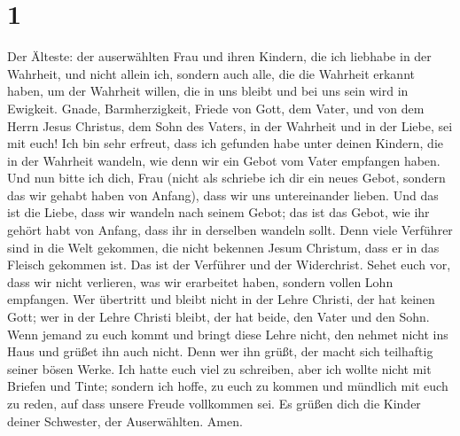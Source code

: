 \hypertarget{section}{%
\section{1}\label{section}}

 Der Älteste: der auserwählten Frau und ihren Kindern, die
ich liebhabe in der Wahrheit, und nicht allein ich, sondern auch alle,
die die Wahrheit erkannt haben,  um der Wahrheit willen, die
in uns bleibt und bei uns sein wird in Ewigkeit.  Gnade,
Barmherzigkeit, Friede von Gott, dem Vater, und von dem Herrn Jesus
Christus, dem Sohn des Vaters, in der Wahrheit und in der Liebe, sei mit
euch!  Ich bin sehr erfreut, dass ich gefunden habe unter
deinen Kindern, die in der Wahrheit wandeln, wie denn wir ein Gebot vom
Vater empfangen haben.  Und nun bitte ich dich, Frau (nicht
als schriebe ich dir ein neues Gebot, sondern das wir gehabt haben von
Anfang), dass wir uns untereinander lieben.  Und das ist die
Liebe, dass wir wandeln nach seinem Gebot; das ist das Gebot, wie ihr
gehört habt von Anfang, dass ihr in derselben wandeln sollt.
 Denn viele Verführer sind in die Welt gekommen, die nicht
bekennen Jesum Christum, dass er in das Fleisch gekommen ist. Das ist
der Verführer und der Widerchrist.  Sehet euch vor, dass wir
nicht verlieren, was wir erarbeitet haben, sondern vollen Lohn
empfangen.  Wer übertritt und bleibt nicht in der Lehre
Christi, der hat keinen Gott; wer in der Lehre Christi bleibt, der hat
beide, den Vater und den Sohn.  Wenn jemand zu euch kommt
und bringt diese Lehre nicht, den nehmet nicht ins Haus und grüßet ihn
auch nicht.  Denn wer ihn grüßt, der macht sich teilhaftig
seiner bösen Werke.  Ich hatte euch viel zu schreiben, aber
ich wollte nicht mit Briefen und Tinte; sondern ich hoffe, zu euch zu
kommen und mündlich mit euch zu reden, auf dass unsere Freude vollkommen
sei.  Es grüßen dich die Kinder deiner Schwester, der
Auserwählten. Amen.
